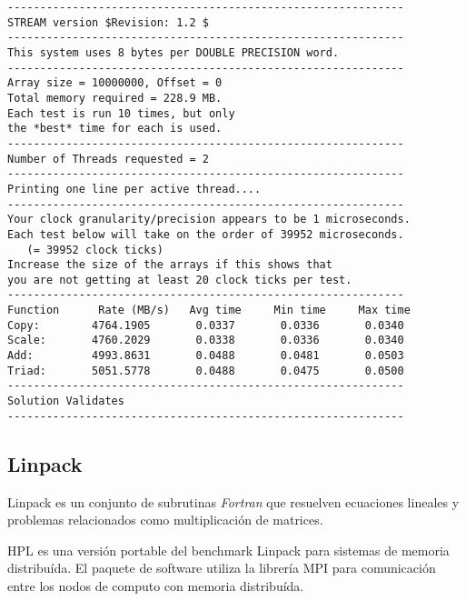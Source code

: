 \documentclass[a4paper]{report}
\begin{document}
\begin{verbatim}
-------------------------------------------------------------
STREAM version $Revision: 1.2 $
-------------------------------------------------------------
This system uses 8 bytes per DOUBLE PRECISION word.
-------------------------------------------------------------
Array size = 10000000, Offset = 0
Total memory required = 228.9 MB.
Each test is run 10 times, but only
the *best* time for each is used.
-------------------------------------------------------------
Number of Threads requested = 2
-------------------------------------------------------------
Printing one line per active thread....
-------------------------------------------------------------
Your clock granularity/precision appears to be 1 microseconds.
Each test below will take on the order of 39952 microseconds.
   (= 39952 clock ticks)
Increase the size of the arrays if this shows that
you are not getting at least 20 clock ticks per test.
-------------------------------------------------------------
Function      Rate (MB/s)   Avg time     Min time     Max time
Copy:        4764.1905       0.0337       0.0336       0.0340
Scale:       4760.2029       0.0338       0.0336       0.0340
Add:         4993.8631       0.0488       0.0481       0.0503
Triad:       5051.5778       0.0488       0.0475       0.0500
-------------------------------------------------------------
Solution Validates
-------------------------------------------------------------
\end{verbatim}

\subsection{Linpack}

\cite{linpack}

Linpack es un conjunto de subrutinas {\it Fortran} que resuelven ecuaciones lineales y problemas relacionados como
multiplicaci\'on de matrices.

\cite{hpl}

HPL es una versi\'on portable del benchmark Linpack para sistemas de memoria distribu\'ida. El paquete de software
utiliza la librer\'ia MPI para comunicaci\'on entre los nodos de computo con memoria distribu\'ida.
\end{document}
